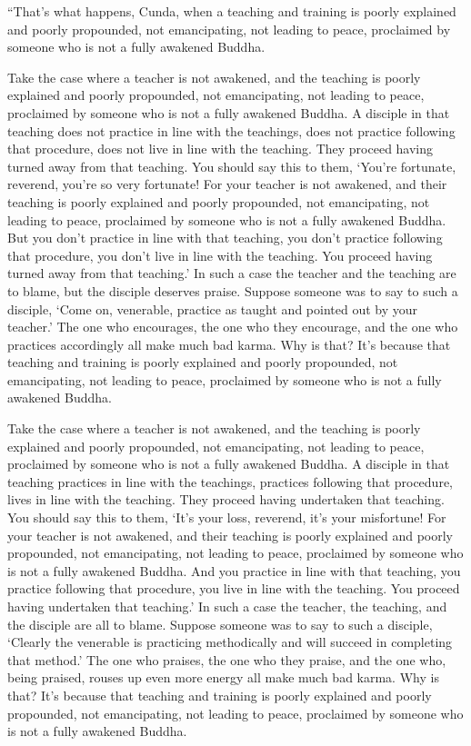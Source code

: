 \documentclass[12pt,openany]{book}%
\begin{document}
“That’s what happens, Cunda, when a teaching and training is poorly explained and poorly propounded, not emancipating, not leading to peace, proclaimed by someone who is not a fully awakened Buddha. 

Take the case where a teacher is not awakened, and the teaching is poorly explained and poorly propounded, not emancipating, not leading to peace, proclaimed by someone who is not a fully awakened Buddha. A disciple in that teaching does not practice in line with the teachings, does not practice following that procedure, does not live in line with the teaching. They proceed having turned away from that teaching. You should say this to them, ‘You’re fortunate, reverend, you’re so very fortunate! For your teacher is not awakened, and their teaching is poorly explained and poorly propounded, not emancipating, not leading to peace, proclaimed by someone who is not a fully awakened Buddha. But you don’t practice in line with that teaching, you don’t practice following that procedure, you don’t live in line with the teaching. You proceed having turned away from that teaching.’ In such a case the teacher and the teaching are to blame, but the disciple deserves praise. Suppose someone was to say to such a disciple, ‘Come on, venerable, practice as taught and pointed out by your teacher.’ The one who encourages, the one who they encourage, and the one who practices accordingly all make much bad karma. Why is that? It’s because that teaching and training is poorly explained and poorly propounded, not emancipating, not leading to peace, proclaimed by someone who is not a fully awakened Buddha. 

Take the case where a teacher is not awakened, and the teaching is poorly explained and poorly propounded, not emancipating, not leading to peace, proclaimed by someone who is not a fully awakened Buddha. A disciple in that teaching practices in line with the teachings, practices following that procedure, lives in line with the teaching. They proceed having undertaken that teaching. You should say this to them, ‘It’s your loss, reverend, it’s your misfortune! For your teacher is not awakened, and their teaching is poorly explained and poorly propounded, not emancipating, not leading to peace, proclaimed by someone who is not a fully awakened Buddha. And you practice in line with that teaching, you practice following that procedure, you live in line with the teaching. You proceed having undertaken that teaching.’ In such a case the teacher, the teaching, and the disciple are all to blame. Suppose someone was to say to such a disciple, ‘Clearly the venerable is practicing methodically and will succeed in completing that method.’ The one who praises, the one who they praise, and the one who, being praised, rouses up even more energy all make much bad karma. Why is that? It’s because that teaching and training is poorly explained and poorly propounded, not emancipating, not leading to peace, proclaimed by someone who is not a fully awakened Buddha. 
\end{document}
